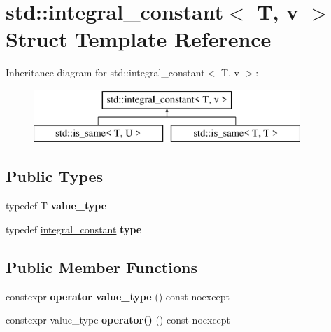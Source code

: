 \hypertarget{structstd_1_1integral__constant}{}\section{std\+:\+:integral\+\_\+constant$<$ T, v $>$ Struct Template Reference}
\label{structstd_1_1integral__constant}
Inheritance diagram for std\+:\+:integral\+\_\+constant$<$ T, v $>$\+:\begin{figure}[H]
\begin{center}
\leavevmode
\includegraphics[height=2.000000cm]{da/dcf/structstd_1_1integral__constant}
\end{center}
\end{figure}
\subsection*{Public Types}
\begin{DoxyCompactItemize}
\item 
typedef T {\bfseries value\+\_\+type}\hypertarget{structstd_1_1integral__constant_a577f947f94f81e5992b37a1748a51d97}{}\label{structstd_1_1integral__constant_a577f947f94f81e5992b37a1748a51d97}

\item 
typedef \hyperlink{structstd_1_1integral__constant}{integral\+\_\+constant} {\bfseries type}\hypertarget{structstd_1_1integral__constant_ab0ee496d528433edf4b782e6fcd47d1e}{}\label{structstd_1_1integral__constant_ab0ee496d528433edf4b782e6fcd47d1e}

\end{DoxyCompactItemize}
\subsection*{Public Member Functions}
\begin{DoxyCompactItemize}
\item 
constexpr {\bfseries operator value\+\_\+type} () const noexcept\hypertarget{structstd_1_1integral__constant_a63cf3115ee14c1bf3e87730d41b3fea3}{}\label{structstd_1_1integral__constant_a63cf3115ee14c1bf3e87730d41b3fea3}

\item 
constexpr value\+\_\+type {\bfseries operator()} () const noexcept\hypertarget{structstd_1_1integral__constant_a3dc39a4cfefa5334de46c5d2f93b9910}{}\label{structstd_1_1integral__constant_a3dc39a4cfefa5334de46c5d2f93b9910}

\end{DoxyCompactItemize}
